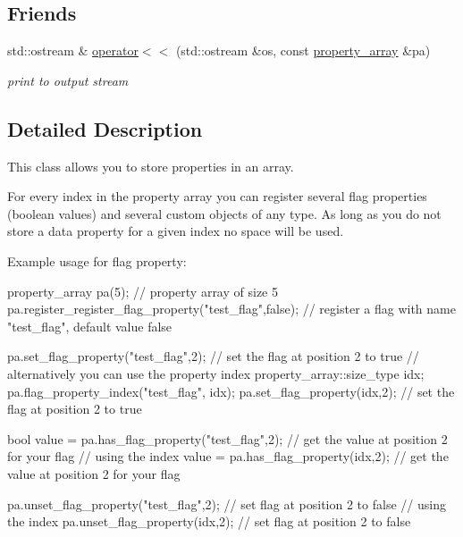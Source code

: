 \subsection*{\-Friends}
\begin{DoxyCompactItemize}
\item 
\hypertarget{classlb_1_1property__array_acd459005d8abb7cd3d8dacac9f88f449}{std\-::ostream \& \hyperlink{classlb_1_1property__array_acd459005d8abb7cd3d8dacac9f88f449}{operator$<$$<$} (std\-::ostream \&os, const \hyperlink{classlb_1_1property__array}{property\-\_\-array} \&pa)}\label{classlb_1_1property__array_acd459005d8abb7cd3d8dacac9f88f449}

\begin{DoxyCompactList}\small\item\em print to output stream \end{DoxyCompactList}\end{DoxyCompactItemize}


\subsection{\-Detailed \-Description}
\-This class allows you to store properties in an array. 

\-For every index in the property array you can register several flag properties (boolean values) and several custom objects of any type. \-As long as you do not store a data property for a given index no space will be used.

\-Example usage for flag property\-: 
\begin{DoxyCode}
        property_array pa(5);                                            //
       property array of size 5
        pa.register_register_flag_property("test_flag",false);           //
       register a flag with name "test_flag", default value false
 
        pa.set_flag_property("test_flag",2);                             // set
       the flag at position 2 to true
        // alternatively you can use the property index
        property_array::size_type idx;
        pa.flag_property_index("test_flag", idx);
        pa.set_flag_property(idx,2);                                     // set
       the flag at position 2 to true
 
        bool value = pa.has_flag_property("test_flag",2);                // get
       the value at position 2 for your flag
        // using the index
        value = pa.has_flag_property(idx,2);                             // get
       the value at position 2 for your flag
 
        pa.unset_flag_property("test_flag",2);                           // set
       flag at position 2 to false
        // using the index
        pa.unset_flag_property(idx,2);                                   // set
       flag at position 2 to false
\end{DoxyCode}


